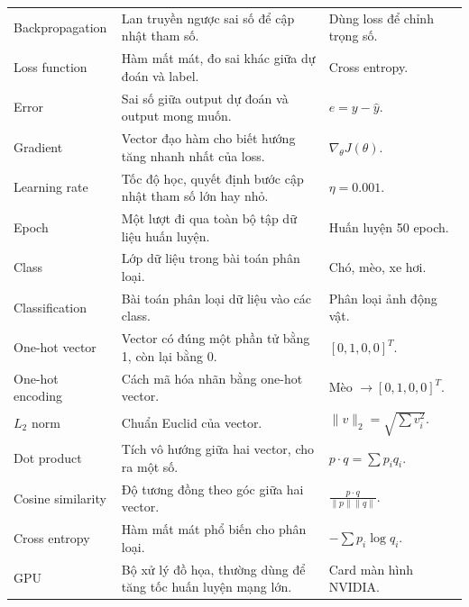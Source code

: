 \documentclass[12pt,a4paper]{report}
\begin{document}
\begin{longtable}{p{}p{}p{}}
Backpropagation & Lan truyền ngược sai số để cập nhật tham số. & Dùng loss để chỉnh trọng số. \\

Loss function & Hàm mất mát, đo sai khác giữa dự đoán và label. & Cross entropy. \\

Error & Sai số giữa output dự đoán và output mong muốn. & $e=y-\hat{y}$. \\

Gradient & Vector đạo hàm cho biết hướng tăng nhanh nhất của loss. & $\nabla_\theta J(\theta)$. \\

Learning rate & Tốc độ học, quyết định bước cập nhật tham số lớn hay nhỏ. & $\eta=0.001$. \\

Epoch & Một lượt đi qua toàn bộ tập dữ liệu huấn luyện. & Huấn luyện 50 epoch. \\

Class & Lớp dữ liệu trong bài toán phân loại. & Chó, mèo, xe hơi. \\

Classification & Bài toán phân loại dữ liệu vào các class. & Phân loại ảnh động vật. \\

One-hot vector & Vector có đúng một phần tử bằng 1, còn lại bằng 0. & $[0,1,0,0]^T$. \\

One-hot encoding & Cách mã hóa nhãn bằng one-hot vector. & Mèo $\rightarrow [0,1,0,0]^T$. \\

$L_2$ norm & Chuẩn Euclid của vector. & $\|v\|_2=\sqrt{\sum v_i^2}$. \\

Dot product & Tích vô hướng giữa hai vector, cho ra một số. & $p\cdot q=\sum p_iq_i$. \\

Cosine similarity & Độ tương đồng theo góc giữa hai vector. & $\frac{p\cdot q}{\|p\|\|q\|}$. \\

Cross entropy & Hàm mất mát phổ biến cho phân loại. & $-\sum p_i\log q_i$. \\

GPU & Bộ xử lý đồ họa, thường dùng để tăng tốc huấn luyện mạng lớn. & Card màn hình NVIDIA. \\

\bottomrule
\end{longtable}
\normalsize
\end{document}
